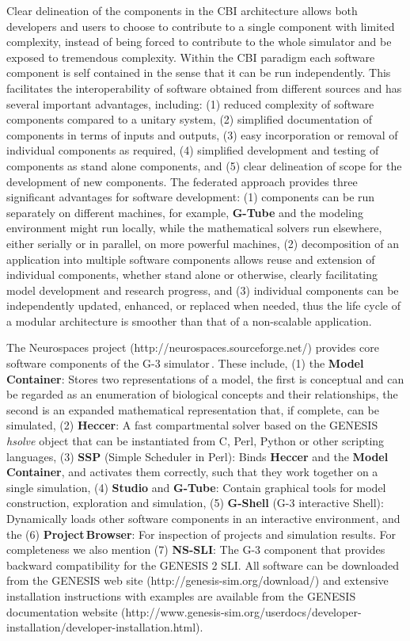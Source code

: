 \documentclass[12pt]{article}
\begin{document}
Clear delineation of the components in the CBI architecture allows both
developers and users to choose to contribute to a single component
with limited complexity, instead of being forced to contribute to the
whole simulator and be exposed to tremendous complexity. Within the
CBI paradigm each software component is self contained in the sense
that it can be run independently. This facilitates the
interoperability of software obtained from different sources and has
several important advantages, including: (1) reduced complexity of
software components compared to a unitary system, (2) simplified
documentation of components in terms of inputs and outputs, (3) easy
incorporation or removal of individual components as required, (4)
simplified development and testing of components as stand alone
components, and (5) clear delineation of scope for the development of new
components. The federated approach provides three significant advantages
for software development: (1) components can be run separately on
different machines, for example, {\bf G-Tube} and the modeling environment
might run locally, while the mathematical solvers run elsewhere, either serially
or in parallel, on more powerful machines, (2) decomposition of an
application into multiple software components allows reuse and
extension of individual components, whether stand alone or otherwise,
clearly facilitating model development and research progress, and (3)
individual components can be independently updated, enhanced, or
replaced when needed, thus the life cycle of a modular architecture is
smoother than that of a non-scalable application.

The Neurospaces project (http://neurospaces.sourceforge.net/) provides
core software components of the G-3
simulator\,\cite{cornelis03:_neuros}. These include, (1) the {\bf Model
  Container}: Stores two representations of a model, the first is
conceptual and can be regarded as an enumeration of biological
concepts and their relationships, the second is an expanded
mathematical representation that, if complete, can be simulated, (2)
{\bf Heccer}: A fast compartmental solver based on the GENESIS {\it
  hsolve} object that can be instantiated from C, Perl, Python or
other scripting languages, (3) {\bf SSP} (Simple Scheduler in Perl):
Binds {\bf Heccer} and the {\bf Model\,Container}, and activates them
correctly, such that they work together on a single simulation, (4)
{\bf Studio} and {\bf G-Tube}: Contain graphical tools for model
construction, exploration and simulation, (5) {\bf G-Shell} (G-3 interactive Shell):
Dynamically loads other software components in an interactive
environment, and the (6) {\bf Project\,Browser}: For inspection of projects
and simulation results. For completeness we also mention (7) {\bf
  NS-SLI}: The G-3 component that provides backward compatibility for
the GENESIS 2 SLI. All software can be downloaded from the GENESIS web site
(http://genesis-sim.org/download/) and extensive installation
instructions with examples are available from the GENESIS
documentation website
(http://www.genesis-sim.org/userdocs/developer-installation/developer-installation.html).
\end{document}
